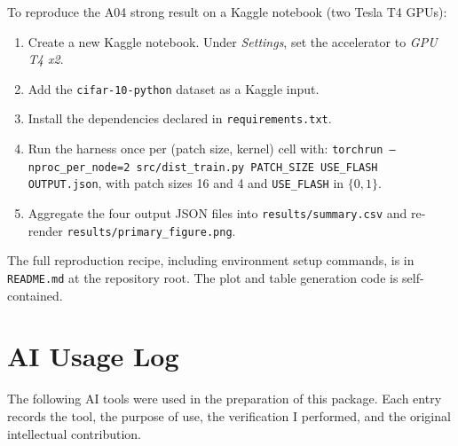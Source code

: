 \documentclass[11pt]{article}
\begin{document}
\noindent To reproduce the A04 strong result on a Kaggle notebook (two Tesla T4 GPUs):

\begin{enumerate}[leftmargin=2em]
    \item Create a new Kaggle notebook. Under \textit{Settings}, set the accelerator to \textit{GPU T4 x2}.
    \item Add the \texttt{cifar-10-python} dataset as a Kaggle input.
    \item Install the dependencies declared in \texttt{requirements.txt}.
    \item Run the harness once per (patch size, kernel) cell with: \texttt{torchrun --nproc\_per\_node=2 src/dist\_train.py PATCH\_SIZE USE\_FLASH OUTPUT.json}, with patch sizes 16 and 4 and \texttt{USE\_FLASH} in $\{0, 1\}$.
    \item Aggregate the four output JSON files into \texttt{results/summary.csv} and re-render \texttt{results/primary\_figure.png}.
\end{enumerate}

\noindent The full reproduction recipe, including environment setup commands, is in \texttt{README.md} at the repository root. The plot and table generation code is self-contained.

\newpage
\appendix

\section{AI Usage Log}
\label{app:ai-usage}

The following AI tools were used in the preparation of this package. Each entry records the tool, the purpose of use, the verification I performed, and the original intellectual contribution.
\end{document}
